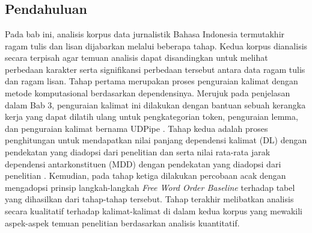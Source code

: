 \chapter{\babEmpat} \label{chap:analisis}

\section{Pendahuluan}
Pada bab ini, analisis korpus data jurnalistik Bahasa Indonesia termutakhir ragam tulis dan lisan dijabarkan melalui beberapa tahap. Kedua korpus dianalisis secara terpisah agar temuan analisis dapat disandingkan untuk melihat perbedaan karakter serta signifikansi perbedaan tersebut antara data ragam tulis dan ragam lisan. Tahap pertama merupakan proses penguraian kalimat dengan metode komputasional berdasarkan dependensinya. Merujuk pada penjelasan dalam Bab 3, penguraian kalimat ini dilakukan dengan bantuan sebuah kerangka kerja yang dapat dilatih ulang untuk pengkategorian token, penguraian lemma, dan penguraian kalimat bernama UDPipe \citep{udpipe2017}. Tahap kedua adalah proses penghitungan untuk mendapatkan nilai panjang dependensi kalimat (DL) dengan pendekatan yang diadopsi dari penelitian \cite{gildea2010grammars} dan \cite{futrell2015large} serta nilai rata-rata jarak dependensi antarkonstituen (MDD) dengan pendekatan yang diadopsi dari penelitian \cite{liu2017dependency}. Kemudian, pada tahap ketiga dilakukan percobaan acak dengan mengadopsi prinsip langkah-langkah \textit{Free Word Order Baseline} \citep{futrell2015large} terhadap tabel yang dihasilkan dari tahap-tahap tersebut. Tahap terakhir melibatkan analisis secara kualitatif terhadap kalimat-kalimat di dalam kedua korpus yang mewakili aspek-aspek temuan penelitian berdasarkan analisis kuantitatif.

